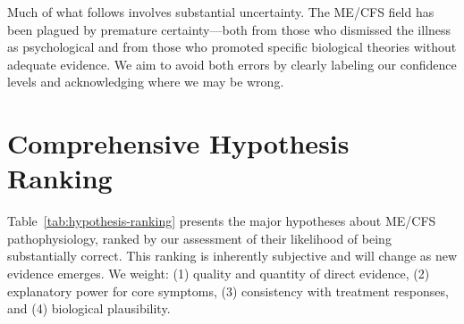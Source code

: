 \begin{observation}
Much of what follows involves substantial uncertainty. The ME/CFS field has been plagued by premature certainty---both from those who dismissed the illness as psychological and from those who promoted specific biological theories without adequate evidence. We aim to avoid both errors by clearly labeling our confidence levels and acknowledging where we may be wrong.
\end{observation}


\section{Comprehensive Hypothesis Ranking}
\label{sec:hypothesis-ranking}

Table~\ref{tab:hypothesis-ranking} presents the major hypotheses about ME/CFS pathophysiology, ranked by our assessment of their likelihood of being substantially correct. This ranking is inherently subjective and will change as new evidence emerges. We weight: (1) quality and quantity of direct evidence, (2) explanatory power for core symptoms, (3) consistency with treatment responses, and (4) biological plausibility.

